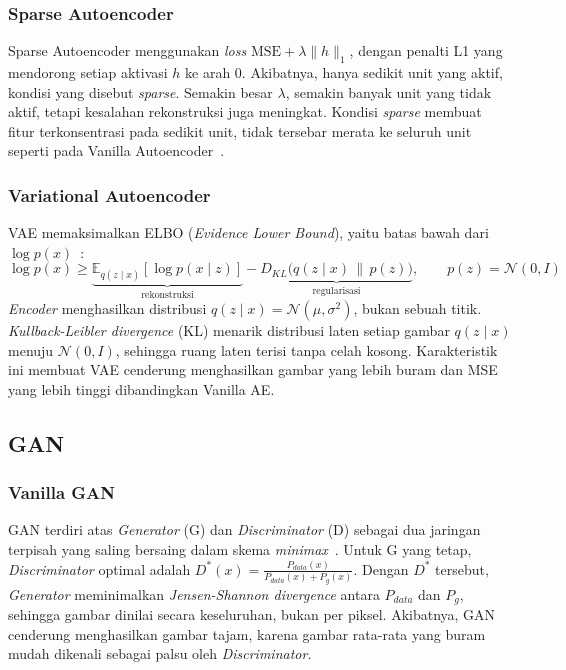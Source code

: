 \documentclass{article}
\begin{document}
\subsubsection{Sparse Autoencoder}
Sparse Autoencoder menggunakan \textit{loss} $\text{MSE}+\lambda \lVert h\rVert_{1}$, dengan penalti L1 yang mendorong setiap aktivasi $h$ ke arah 0. Akibatnya, hanya sedikit unit yang aktif, kondisi yang disebut \textit{sparse}. Semakin besar $\lambda$, semakin banyak unit yang tidak aktif, tetapi kesalahan rekonstruksi juga meningkat. Kondisi \textit{sparse} membuat fitur terkonsentrasi pada sedikit unit, tidak tersebar merata ke seluruh unit seperti pada Vanilla Autoencoder~\cite{ng2011}.

\subsubsection{Variational Autoencoder}
VAE memaksimalkan ELBO (\textit{Evidence Lower Bound}), yaitu batas bawah dari $\log{p(x)}$~\cite{kingma2014}:
\[\log{p(x)}\ge \underbrace{\mathbb{E}_{q(z\mid x)}[\log{p(x\mid z)}]}_{\text{rekonstruksi}} - \underbrace{D_{KL}\big(q(z\mid x)\,\|\,p(z)\big)}_{\text{regularisasi}}, \qquad p(z)=\mathcal{N}(0,I)\]
\textit{Encoder} menghasilkan distribusi $q(z\mid x) = \mathcal{N}(\mu, \sigma^2)$, bukan sebuah titik. \textit{Kullback-Leibler divergence} (KL) menarik distribusi laten setiap gambar $q(z\mid x)$ menuju $\mathcal{N}(0,I)$, sehingga ruang laten terisi tanpa celah kosong. Karakteristik ini membuat VAE cenderung menghasilkan gambar yang lebih buram dan MSE yang lebih tinggi dibandingkan Vanilla AE.

\subsection{GAN}
\subsubsection{Vanilla GAN}
GAN terdiri atas \textit{Generator} (G) dan \textit{Discriminator} (D) sebagai dua jaringan terpisah yang saling bersaing dalam skema \textit{minimax}~\cite{goodfellow2014}. Untuk G yang tetap, \textit{Discriminator} optimal adalah $D^*(x)=\frac{P_{data}(x)}{P_{data}(x)+P_{g}(x)}$. Dengan $D^*$ tersebut, \textit{Generator} meminimalkan \textit{Jensen-Shannon divergence} antara $P_{data}$ dan $P_g$, sehingga gambar dinilai secara keseluruhan, bukan per piksel. Akibatnya, GAN cenderung menghasilkan gambar tajam, karena gambar rata-rata yang buram mudah dikenali sebagai palsu oleh \textit{Discriminator}.
\end{document}
